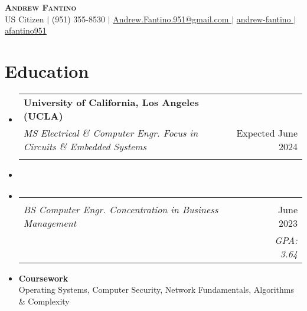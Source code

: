 \documentclass[letterpaper,11pt]{article}
\makeatletter
\newcommand{\resumeEducationSubheading}[4]{
  \vspace{-2pt}\item
    \begin{tabular*}{0.97\textwidth}[t]{l@{\extracolsep{\fill}}r}
      \textbf{#1} \\
      \textit{\small#3} & #2 \\
      & \textit{\small #4} \\
    \end{tabular*}\vspace{-7pt}
}
\newcommand{\resumeSubHeadingListStart}{\begin{itemize}[leftmargin=0.15in, label={}]}
\newcommand{\resumeSubHeadingListEnd}{\end{itemize}}
\makeatother
\begin{document}
\begin{center}
  \vspace{1.75em}
  \textbf{\Huge \scshape Andrew Fantino} \\ \vspace{3pt}
  \small US Citizen $|$
  \small {} (951) 355-8530 $|$ 
  \href{mailto:andrew.fantino.951@gmail.com}{  Andrew.Fantino.951@gmail.com } $|$ 
  \href{https://linkedin.com/in/andrew-fantino/}{  andrew-fantino } $|$
  \href{https://github.com/afantino951}{  afantino951} 
\end{center}

\section{Education}
  \resumeSubHeadingListStart
    \resumeEducationSubheading
      {University of California, Los Angeles (UCLA)}{Expected June 2024}
      {MS Electrical \& Computer Engr. Focus in Circuits \& Embedded Systems}{}
      \vspace{-53pt}\item

    \resumeEducationSubheading
      {}{June 2023}
      {BS Computer Engr. Concentration in Business Management}{GPA: 3.64}
      \vspace{-20pt}\item
      \textbf{Coursework} \\

        \small\quad Operating Systems, Computer Security, Network Fundamentals, Algorithms \& Complexity
        
        
    \vspace{-2pt}
  \resumeSubHeadingListEnd
\end{document}
